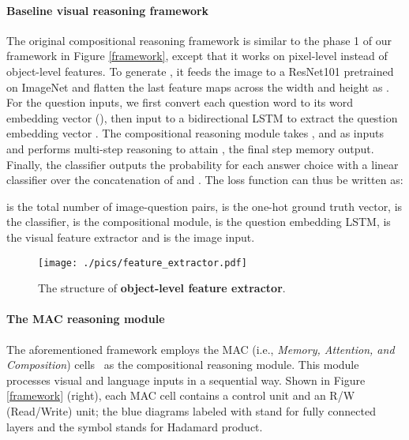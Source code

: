 \documentclass[final]{cvpr}
\begin{document}
\paragraph{Baseline visual reasoning framework} The original compositional reasoning framework \cite{hudson2018compositional} is similar to the phase 1 of our framework in Figure \ref{framework}, except that it works on pixel-level instead of object-level features. To generate , it feeds the image to a ResNet101 \cite{He_2016_CVPR} pretrained on ImageNet \cite{deng2009imagenet} and flatten the last feature maps across the width and height as . For the question inputs, we first convert each question word to its word embedding vector (), then input  to a bidirectional LSTM \cite{hochreiter1997long,graves2005framewise} to extract the question embedding vector . The compositional reasoning module takes ,  and  as inputs and performs multi-step reasoning to attain , the final step memory output. Finally, the classifier outputs the probability for each answer choice with a linear classifier over the concatenation of  and . The loss function can thus be written as:

 is the total number of image-question pairs,  is the one-hot ground truth vector,  is the classifier,  is the compositional module,  is the question embedding LSTM,  is the visual feature extractor and  is the image input.



\begin{figure}[t]
\centering
\texttt{[image: ./pics/feature\_extractor.pdf]}
\caption{The structure of \textbf{object-level feature extractor}.}
\label{ext}
\vspace{-6mm}
\end{figure}
\vspace{-2mm}
\paragraph{The MAC reasoning module}
The aforementioned framework employs the MAC (i.e., \emph{Memory, Attention, and Composition}) cells~\cite{hudson2018compositional} as the compositional reasoning module.
This module processes visual and language inputs in a sequential way. Shown in Figure \ref{framework} (right), each MAC cell contains a control unit and an R/W (Read/Write) unit; the blue diagrams labeled with  stand for fully connected layers and the symbol  stands for Hadamard product.
\end{document}
